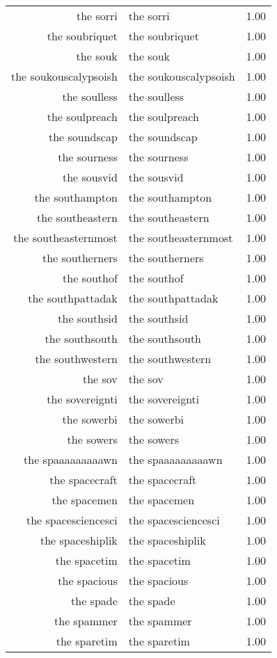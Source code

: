 \begin{table}[ht]
\begin{tabular}{rlr}
  the sorri & the sorri & 1.00 \\ 
  the soubriquet & the soubriquet & 1.00 \\ 
  the souk & the souk & 1.00 \\ 
  the soukouscalypsoish & the soukouscalypsoish & 1.00 \\ 
  the soulless & the soulless & 1.00 \\ 
  the soulpreach & the soulpreach & 1.00 \\ 
  the soundscap & the soundscap & 1.00 \\ 
  the sourness & the sourness & 1.00 \\ 
  the sousvid & the sousvid & 1.00 \\ 
  the southampton & the southampton & 1.00 \\ 
  the southeastern & the southeastern & 1.00 \\ 
  the southeasternmost & the southeasternmost & 1.00 \\ 
  the southerners & the southerners & 1.00 \\ 
  the southof & the southof & 1.00 \\ 
  the southpattadak & the southpattadak & 1.00 \\ 
  the southsid & the southsid & 1.00 \\ 
  the southsouth & the southsouth & 1.00 \\ 
  the southwestern & the southwestern & 1.00 \\ 
  the sov & the sov & 1.00 \\ 
  the sovereignti & the sovereignti & 1.00 \\ 
  the sowerbi & the sowerbi & 1.00 \\ 
  the sowers & the sowers & 1.00 \\ 
  the spaaaaaaaaawn & the spaaaaaaaaawn & 1.00 \\ 
  the spacecraft & the spacecraft & 1.00 \\ 
  the spacemen & the spacemen & 1.00 \\ 
  the spacesciencesci & the spacesciencesci & 1.00 \\ 
  the spaceshiplik & the spaceshiplik & 1.00 \\ 
  the spacetim & the spacetim & 1.00 \\ 
  the spacious & the spacious & 1.00 \\ 
  the spade & the spade & 1.00 \\ 
  the spammer & the spammer & 1.00 \\ 
  the sparetim & the sparetim & 1.00 \\ 

\end{tabular}
\end{table}
